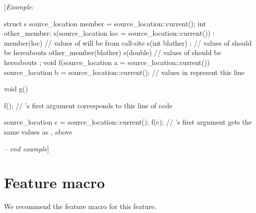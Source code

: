 \documentclass[a4paper,article]{article}
\begin{document}
[\emph{Example:}
\begin{codeblock}
struct s {
  source_location member = source_location::current();
  int other_member;
  s(source_location loc = source_location::current())
    : member(loc) // values of  will be from call-site
  {}
  s(int blather) : // values of  should be hereabouts
    other_member(blather)
  {}
  s(double) // values of  should be hereabouts
  {}
};
void f(source_location a = source_location::current()) {
  source_location b = source_location::current(); // values in  represent this line
}

void g() {
  f(); // 's first argument corresponds to this line of code

  source_location c = source_location::current();
  f(c); // 's first argument gets the same values as , above
}
\end{codeblock}
-- \emph{end example}]

\section{Feature macro}
We recommend the feature macro  for this feature.
\end{document}
